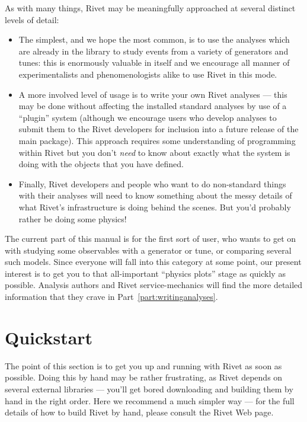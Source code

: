 As with many things, Rivet may be meaningfully approached at several distinct
levels of detail:

\begin{itemize}
\item The simplest, and we hope the most common, is to use the analyses which
  are already in the library to study events from a variety of generators and
  tunes: this is enormously valuable in itself and we encourage all manner of
  experimentalists and phenomenologists alike to use Rivet in this mode.
\item A more involved level of usage is to write your own Rivet analyses ---
  this may be done without affecting the installed standard analyses by use of a
  ``plugin'' system (although we encourage users who develop analyses to submit
  them to the Rivet developers for inclusion into a future release of the main
  package). This approach requires some understanding of programming within
  Rivet but you don't \emph{need} to know about exactly what the system is doing
  with the objects that you have defined.
\item Finally, Rivet developers and people who want to do non-standard things
  with their analyses will need to know something about the messy details of
  what Rivet's infrastructure is doing behind the scenes. But you'd probably
  rather be doing some physics!
\end{itemize}

The current part of this manual is for the first sort of user, who wants to get
on with studying some observables with a generator or tune, or comparing several
such models. Since everyone will fall into this category at some point, our
present interest is to get you to that all-important ``physics plots'' stage as
quickly as possible. Analysis authors and Rivet service-mechanics will find the
more detailed information that they crave in Part~\ref{part:writinganalyses}.


\section{Quickstart}

The point of this section is to get you up and running with Rivet as soon as
possible. Doing this by hand may be rather frustrating, as Rivet depends on
several external libraries --- you'll get bored downloading and building them by
hand in the right order. Here we recommend a much simpler way --- for the
full details of how to build Rivet by hand, please consult the Rivet Web page.



